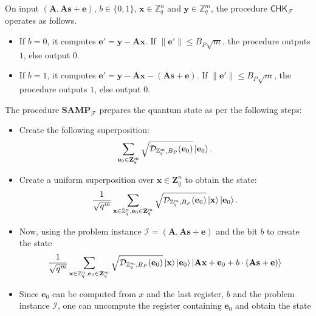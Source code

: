 \documentclass[cryptography,review,submit,pdftex,moreauthors,amsmath,amssymb,aps,strict]{Definitions/mdpi}
\begin{document}
\begin{Definition}
\begin{enumerate}
    On input $(\mathbf{A},\mathbf{A}\mathbf{s}
    +\mathbf{e})$, $b\in\{0,1\}$, $\mathbf{x}\in \mathbb{Z}^n_q$ and $\mathbf{y}\in \mathbb{Z}^m_q$, the procedure $\mathsf{CHK}_{\mathcal{F}}$ operates as follows.
    \begin{itemize}
        \item If $b=0$, it computes $\mathbf{e}'=\mathbf{y}-\mathbf{A} \mathbf{x}$. If $\|\mathbf{e}'\|\leq B_P\sqrt{m}$, the procedure outputs $1$, else output $0$.
        \item If $b=1$, it computes $\mathbf{e}'=\mathbf{y}-\mathbf{A}\mathbf{x} -(\mathbf{A}\mathbf{s}+\mathbf{e})$. If $\|\mathbf{e}'\|\leq B_P\sqrt{m}$, the procedure outputs $1$, else output $0$.
    \end{itemize}

    The procedure $\mathbf{SAMP}_{\mathcal{F}}$ prepares the quantum state as per the following steps:
    \begin{itemize}
        \item Create the following superposition:
        \begin{align}
            \sum_{\mathbf{e}_0\in\mathbf{Z}^m_q} \sqrt{\mathcal{D}_{\mathbb{Z}^m_q,B_P}(\mathbf{e}_0)}\ket{\mathbf{e}_0}.
        \end{align}
        \item Create a uniform superposition over $\mathbf{x}\in\mathbf{Z}^n_q$ to obtain the state:
        \begin{align}
            \frac{1}{\sqrt{q^m}}\sum_{\mathbf{x}\in\mathbb{Z}^n_q,\mathbf{e}_0\in\mathbf{Z}^m_q} \sqrt{\mathcal{D}_{\mathbb{Z}^m_q,B_P}(\mathbf{e}_0)}\ket{\mathbf{x}}\ket{\mathbf{e}_0}.
        \end{align}
        \item Now, using the problem instance $\mathcal{I}=(\mathbf{A},\mathbf{A}\mathbf{s}+\mathbf{e})$ and the bit $b$ to create the state
        \begin{align}
            \frac{1}{\sqrt{q^m}}\sum_{\mathbf{x}\in\mathbb{Z}^n_q,\mathbf{e}_0\in\mathbf{Z}^m_q} \sqrt{\mathcal{D}_{\mathbb{Z}^m_q,B_P}(\mathbf{e}_0)}\ket{\mathbf{x}}\ket{\mathbf{e}_0}\ket{\mathbf{A}\mathbf{x}+\mathbf{e}_0+b\cdot (\mathbf{A}\mathbf{s}+\mathbf{e})}  
        \end{align}
        \item Since $\mathbf{e}_0$ can be computed from $x$ and the last register, $b$ and the problem instance $\mathcal{I}$, one can uncompute the register containing $\mathbf{e}_0$ and obtain the state
        \begin{align}

\end{align}
\end{itemize}
\end{enumerate}
\end{Definition}
\end{document}

